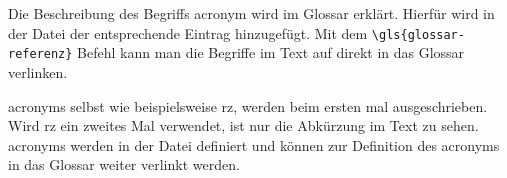 Die Beschreibung des Begriffs \gls{acronym} wird im Glossar erklärt.
Hierfür wird in der Datei  der entsprechende Eintrag hinzugefügt.
Mit dem \lstinline|\gls{glossar-referenz}| Befehl kann man die Begriffe im Text auf direkt in das Glossar verlinken.\\
\par
\glspl{acronym} selbst wie beispielsweise \gls{rz}, werden beim ersten mal ausgeschrieben.
Wird \gls{rz} ein zweites Mal verwendet, ist nur die Abkürzung im Text zu sehen.
\glspl{acronym} werden in der Datei  definiert und 
können zur Definition des \gls{acronym}s in das Glossar weiter verlinkt werden.
